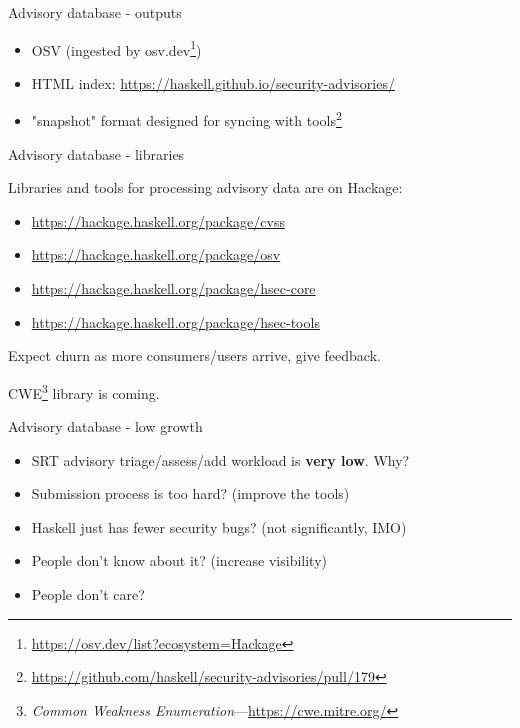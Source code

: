 \documentclass[ignorenonframetext,aspectratio=169,12pt]{beamer}
\begin{document}
\begin{frame}{Advisory database - outputs}
  \begin{itemize}
    \item OSV (ingested by
      osv.dev\footnote{\url{https://osv.dev/list?ecosystem=Hackage}})
    \item HTML index: \url{https://haskell.github.io/security-advisories/}
    \item "snapshot" format designed for syncing with
      tools\footnote{\url{https://github.com/haskell/security-advisories/pull/179}}
  \end{itemize}
\end{frame}

\begin{frame}{Advisory database - libraries}

  Libraries and tools for processing advisory data are on Hackage:

  \begin{itemize}
    \item \url{https://hackage.haskell.org/package/cvss}
    \item \url{https://hackage.haskell.org/package/osv}
    \item \url{https://hackage.haskell.org/package/hsec-core}
    \item \url{https://hackage.haskell.org/package/hsec-tools}
  \end{itemize}

  Expect churn as more consumers/users arrive, give feedback.

  CWE\footnote{{\em Common Weakness Enumeration}---\url{https://cwe.mitre.org/}} library is coming.

\end{frame}


\begin{frame}{Advisory database - low growth}
  \begin{itemize}
    \item SRT advisory triage/assess/add workload is {\bf very low}.
      Why?
    \item Submission process is too hard? (improve the tools)
    \item Haskell just has fewer security bugs? (not
      significantly, IMO)
    \item People don't know about it? (increase visibility)
    \item People don't care?
  \end{itemize}
\end{frame}
\end{document}
